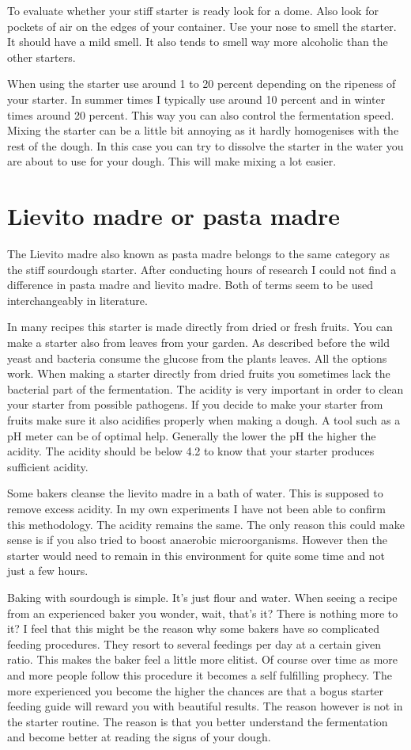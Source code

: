 To evaluate whether your stiff starter is ready look for a dome. Also look for
pockets of air on the edges of your container. Use your nose to smell the
starter. It should have a mild smell. It also tends to smell way more
alcoholic than the other starters.

When using the starter use around 1 to 20 percent depending on the ripeness of
your starter. In summer times I typically use around 10 percent and in winter
times around 20 percent. This way you can also control the fermentation speed.
Mixing the starter can be a little bit annoying as it hardly homogenises with
the rest of the dough. In this case you can try to dissolve the starter in the
water you are about to use for your dough. This will make mixing a lot easier.


\section{Lievito madre or pasta madre}

The Lievito madre also known as pasta madre belongs to the same category as
the stiff sourdough starter. After conducting hours of research I could not
find a difference in pasta madre and lievito madre. Both of terms seem to be
used interchangeably in literature.

In many recipes this starter is made directly
from dried or fresh fruits. You can make a starter also from leaves from your
garden. As described before the wild yeast and bacteria consume the glucose
from the plants leaves. All the options work. When making a starter directly
from dried fruits you sometimes lack the bacterial part of the fermentation.
The acidity is very important in order to clean your starter from possible
pathogens. If you decide to make your starter from fruits make sure it also
acidifies properly when making a dough. A tool such as a pH meter can be of
optimal help. Generally the lower the pH the higher the acidity. The acidity
should be below 4.2 to know that your starter produces sufficient acidity.

Some bakers cleanse the lievito madre in a bath of water. This is supposed to
remove excess acidity. In my own experiments I have not been able to confirm
this methodology. The acidity remains the same. The only reason this could
make sense is if you also tried to boost anaerobic microorganisms. However then the
starter would need to remain in this environment for quite some time and not just
a few hours.

Baking with sourdough is simple. It's just flour and water. When seeing a recipe
from an experienced baker you wonder, wait, that's it? There is nothing more
to it? I feel that this might be the reason why some bakers have so complicated
feeding procedures. They resort to several feedings per day at a certain given ratio.
This makes the baker feel a little more elitist. Of course over time as
more and more people follow this procedure it becomes a self fulfilling prophecy.
The more experienced you become the higher the chances are that a bogus starter
feeding guide will reward you with beautiful results. The reason however is
not in the starter routine. The reason is that you better understand the fermentation
and become better at reading the signs of your dough.


